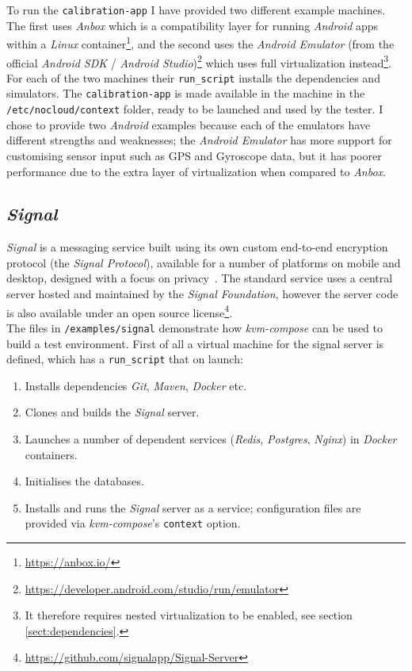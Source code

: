 \documentclass[
    author={Jacob Daniel Halsey},
    supervisor={Prof. Awais Rashid},
    degree={BSc},
    title={Building a Testbed for Evaluating Privacy Enhancing Technologies  (PETs)},
    subtitle={},
    type={software development},
    year={2021}
]{dissertation}
\begin{document}
To run the \texttt{calibration-app} I have provided two different example machines. The first
uses \emph{Anbox} which is a compatibility layer for running \emph{Android} apps within a \emph{Linux}
container\footnote{\url{https://anbox.io/}}, and the second uses the \emph{Android Emulator} 
(from the official \emph{Android SDK} / 
\emph{Android Studio})\footnote{\url{https://developer.android.com/studio/run/emulator}}
which uses full virtualization instead\footnote{It therefore requires nested 
virtualization to be enabled, see section \ref{sect:dependencies}.}.
For each of the two machines their \texttt{run\_script} installs the
dependencies and simulators. The \texttt{calibration-app} is made available in the machine in the 
\texttt{/etc/nocloud/context} folder, ready to be launched and used by the tester.
I chose to provide two \emph{Android} examples because each of the emulators have different
strengths and weaknesses; the \emph{Android Emulator} has more support for customising sensor
input such as GPS and Gyroscope data, but it has poorer performance due to the extra layer of virtualization
when compared to \emph{Anbox}.

\subsection{\emph{Signal}}

\emph{Signal} is a messaging service built using its own custom end-to-end encryption protocol 
(the \emph{Signal Protocol}), available for a number of platforms on mobile and desktop,
designed with a focus on privacy~\cite{signal}. The standard service uses a central server
hosted and maintained by the \emph{Signal Foundation},
however the server code is also available under an open source 
license\footnote{\url{https://github.com/signalapp/Signal-Server}}. \\

The files in \texttt{/examples/signal} demonstrate how \emph{kvm-compose} can be used to build
a test environment. First of all a virtual machine for the signal server is defined,
which has a \texttt{run\_script} that on launch:

\begin{singlespace}
	\begin{enumerate}
		\item Installs dependencies \emph{Git}, \emph{Maven}, \emph{Docker} etc.
		\item Clones and builds the \emph{Signal} server.
		\item Launches a number of dependent services (\emph{Redis}, \emph{Postgres}, \emph{Nginx})
		in \emph{Docker} containers.
		\item Initialises the databases.
		\item Installs and runs the \emph{Signal} server as a service; configuration files
		are provided via \emph{kvm-compose}'s \texttt{context} option.
	\end{enumerate}
\end{singlespace}
\end{document}
